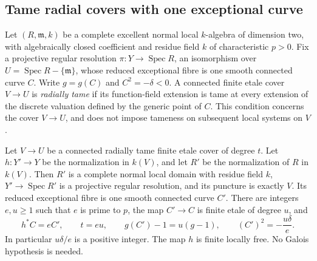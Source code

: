 \subsection{Tame radial covers with one exceptional curve}

Let $(R,\mathfrak m,k)$ be a complete excellent normal local
$k$-algebra of dimension two, with algebraically closed coefficient
and residue field $k$ of characteristic $p>0$. Fix a projective
regular resolution $\pi:Y\to\operatorname{Spec}R$, an isomorphism
over $U=\operatorname{Spec}R-\{\mathfrak m\}$, whose reduced
exceptional fibre is one smooth connected curve $C$. Write
$g=g(C)$ and $C^2=-\delta<0$. A connected finite etale cover
$V\to U$ is \emph{radially tame} if its function-field extension
is tame at every extension of the discrete valuation defined
by the generic point of $C$. This condition concerns the cover
$V\to U$, and does not impose tameness on subsequent local
systems on $V$.

\begin{lemma}
\label{D:radial-tame-cover-one-curve}
Let $V\to U$ be a connected radially tame finite etale cover
of degree $t$. Let $h:Y'\to Y$ be the normalization in $k(V)$,
and let $R'$ be the normalization of $R$ in $k(V)$. Then $R'$
is a complete normal local domain with residue field $k$,
$Y'\to\operatorname{Spec}R'$ is a projective regular resolution,
and its puncture is exactly $V$. Its reduced exceptional fibre
is one smooth connected curve $C'$. There are integers $e,u\geq1$
such that $e$ is prime to $p$, the map $C'\to C$ is finite
etale of degree $u$, and
\[
 h^*C=eC',\qquad t=eu,\qquad
 g(C')-1=u(g-1),\qquad (C')^2=-\frac{u\delta}{e}.
                                                        \tag{D.RT.1}
\]
In particular $u\delta/e$ is a positive integer. The map
$h$ is finite locally free. No Galois hypothesis is needed.
\end{lemma}

